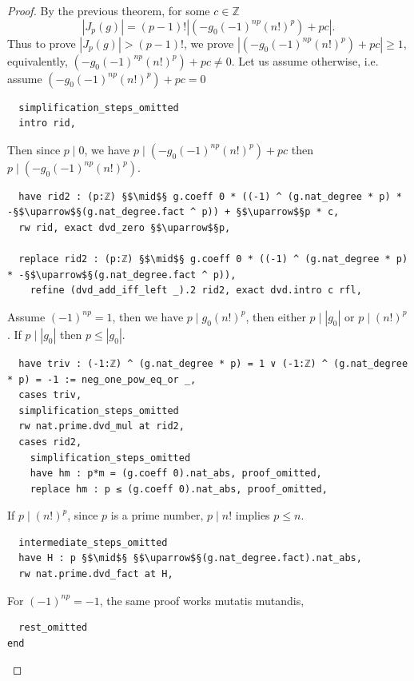 \documentclass{report}
\theoremstyle{definition}
\begin{document}
\begin{proof}
By the previous theorem, for some $c\in\mathbb Z$
$$
|J_p(g)|=(p-1)!\left|(-g_0(-1)^{np}(n!)^p)+pc\right|.
$$
Thus to prove $|J_p(g)|>(p-1)!$, we prove $\left|(-g_0(-1)^{np}(n!)^p)+pc\right| \ge 1$, equivalently, $(-g_0(-1)^{np}(n!)^p)+pc\ne0$. Let us assume otherwise, i.e. assume $(-g_0(-1)^{np}(n!)^p)+pc=0$
\begin{verbatim}
  simplification_steps_omitted
  intro rid,
\end{verbatim}

Then since $p\mid 0$, we have $p\mid (-g_0(-1)^{np}(n!)^p)+pc$ then $p\mid(-g_0(-1)^{np}(n!)^p)$.
\begin{verbatim}
  have rid2 : (p:ℤ) §$\mid$§ g.coeff 0 * ((-1) ^ (g.nat_degree * p) * -§$\uparrow$§(g.nat_degree.fact ^ p)) + §$\uparrow$§p * c,
  rw rid, exact dvd_zero §$\uparrow$§p,
  
  replace rid2 : (p:ℤ) §$\mid$§ g.coeff 0 * ((-1) ^ (g.nat_degree * p) * -§$\uparrow$§(g.nat_degree.fact ^ p)),
    refine (dvd_add_iff_left _).2 rid2, exact dvd.intro c rfl,
\end{verbatim}

Assume $(-1)^{np}=1$, then we have $p\mid g_0 (n!)^p$, then either $p\mid |g_0|$ or $p\mid (n!)^p$. If $p\mid |g_0|$ then $p\le |g_0|$.
\begin{verbatim}
  have triv : (-1:ℤ) ^ (g.nat_degree * p) = 1 ∨ (-1:ℤ) ^ (g.nat_degree * p) = -1 := neg_one_pow_eq_or _,
  cases triv,
  simplification_steps_omitted
  rw nat.prime.dvd_mul at rid2,
  cases rid2,
    simplification_steps_omitted
    have hm : p*m = (g.coeff 0).nat_abs, proof_omitted,
    replace hm : p ≤ (g.coeff 0).nat_abs, proof_omitted,
\end{verbatim}

If $p\mid (n!)^p$, since $p$ is a prime number, $p\mid n!$  implies $p\le n$.
\begin{verbatim}
  intermediate_steps_omitted
  have H : p §$\mid$§ §$\uparrow$§(g.nat_degree.fact).nat_abs,
  rw nat.prime.dvd_fact at H,
\end{verbatim}

For $(-1)^{np}=-1$, the same proof works mutatis mutandis,
\begin{verbatim}
  rest_omitted
end
\end{verbatim}
\end{proof}
\end{document}
